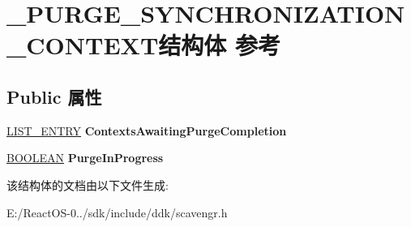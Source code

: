 \hypertarget{struct___p_u_r_g_e___s_y_n_c_h_r_o_n_i_z_a_t_i_o_n___c_o_n_t_e_x_t}{}\section{\+\_\+\+P\+U\+R\+G\+E\+\_\+\+S\+Y\+N\+C\+H\+R\+O\+N\+I\+Z\+A\+T\+I\+O\+N\+\_\+\+C\+O\+N\+T\+E\+X\+T结构体 参考}
\label{struct___p_u_r_g_e___s_y_n_c_h_r_o_n_i_z_a_t_i_o_n___c_o_n_t_e_x_t}
\subsection*{Public 属性}
\begin{DoxyCompactItemize}
\item 
\mbox{\label{struct___p_u_r_g_e___s_y_n_c_h_r_o_n_i_z_a_t_i_o_n___c_o_n_t_e_x_t_aae28bc733538b6c6c8cddb26f84bf3b1}} 
\hyperlink{struct___l_i_s_t___e_n_t_r_y}{L\+I\+S\+T\+\_\+\+E\+N\+T\+RY} {\bfseries Contexts\+Awaiting\+Purge\+Completion}
\item 
\mbox{\label{struct___p_u_r_g_e___s_y_n_c_h_r_o_n_i_z_a_t_i_o_n___c_o_n_t_e_x_t_a8a41b3b4a49be53a16e7c553964f35a8}} 
\hyperlink{_processor_bind_8h_a112e3146cb38b6ee95e64d85842e380a}{B\+O\+O\+L\+E\+AN} {\bfseries Purge\+In\+Progress}
\end{DoxyCompactItemize}


该结构体的文档由以下文件生成\+:\begin{DoxyCompactItemize}
\item 
E\+:/\+React\+O\+S-\/0../sdk/include/ddk/scavengr.\+h\end{DoxyCompactItemize}
